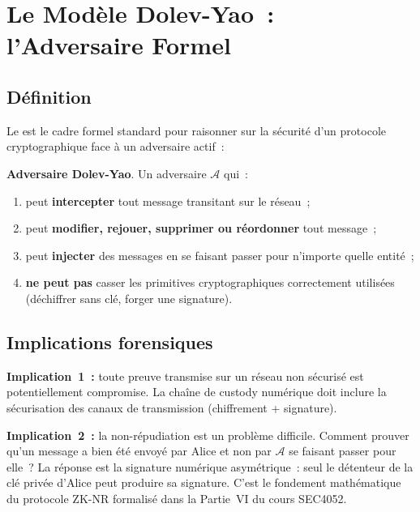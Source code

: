 \section{Le Modèle Dolev-Yao~: l'Adversaire Formel}
\label{sec:dolev-yao}

\subsection{Définition}

Le  \cite{dolevyao1983}
est le cadre formel standard pour raisonner sur la sécurité d'un protocole
cryptographique face à un adversaire actif~:

\begin{boxdef}
\textbf{Adversaire Dolev-Yao}. Un adversaire $\mathcal{A}$ qui~:
\begin{enumerate}
    \item peut \textbf{intercepter} tout message transitant sur le réseau~;
    \item peut \textbf{modifier, rejouer, supprimer ou réordonner} tout message~;
    \item peut \textbf{injecter} des messages en se faisant passer pour
          n'importe quelle entité~;
    \item \textbf{ne peut pas} casser les primitives cryptographiques
          correctement utilisées (déchiffrer sans clé, forger une signature).
\end{enumerate}
\end{boxdef}

\subsection{Implications forensiques}

\textbf{Implication~1~:} toute preuve transmise sur un réseau non sécurisé
est potentiellement compromise. La chaîne de custody numérique doit inclure
la sécurisation des canaux de transmission (chiffrement + signature).

\textbf{Implication~2~:} la non-répudiation est un problème difficile.
Comment prouver qu'un message a bien été envoyé par Alice et non par
$\mathcal{A}$ se faisant passer pour elle~? La réponse est la signature
numérique asymétrique~: seul le détenteur de la clé privée d'Alice peut
produire sa signature. C'est le fondement mathématique du protocole ZK-NR
\cite{minka2025zknr} formalisé dans la Partie~VI du cours SEC4052.

